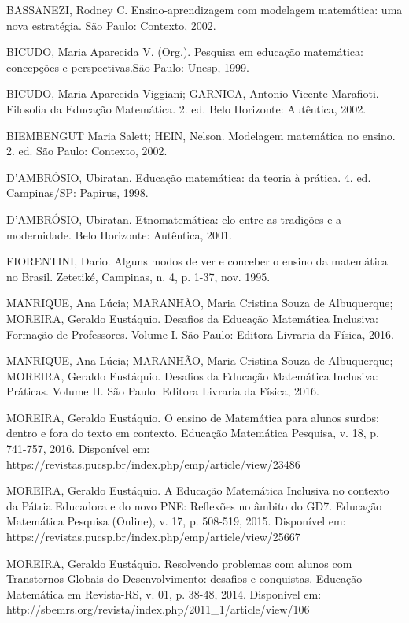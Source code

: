 \begin{thebibliography}{999}
	 BASSANEZI, Rodney C. Ensino-aprendizagem com modelagem matemática: uma nova estratégia. São Paulo: Contexto, 2002. 
	
	 BICUDO, Maria Aparecida V. (Org.). Pesquisa em educação matemática: concepções e perspectivas.São Paulo: Unesp, 1999.
	
	 BICUDO, Maria Aparecida Viggiani; GARNICA, Antonio Vicente Marafioti. Filosofia da Educação Matemática. 2. ed. Belo Horizonte: Autêntica, 2002.
	
	 BIEMBENGUT Maria Salett; HEIN, Nelson. Modelagem matemática no ensino. 2. ed. São Paulo: Contexto, 2002.
	
	 D’AMBRÓSIO, Ubiratan. Educação matemática: da teoria à prática. 4. ed. Campinas/SP: Papirus, 1998.
	
	 D’AMBRÓSIO, Ubiratan. Etnomatemática: elo entre as tradições e a modernidade. Belo Horizonte: Autêntica, 2001.
	
	 FIORENTINI, Dario. Alguns modos de ver e conceber o ensino da matemática no Brasil. Zetetiké, Campinas, n. 4, p. 1-37, nov. 1995.
	
	 MANRIQUE, Ana Lúcia; MARANHÃO, Maria Cristina Souza de Albuquerque; MOREIRA, Geraldo Eustáquio. Desafios da Educação Matemática Inclusiva: Formação de Professores. Volume I. São Paulo: Editora Livraria da Física, 2016.
	
	 MANRIQUE, Ana Lúcia; MARANHÃO, Maria Cristina Souza de Albuquerque; MOREIRA, Geraldo Eustáquio. Desafios da Educação Matemática Inclusiva: Práticas. Volume II. São Paulo: Editora Livraria da Física, 2016.
	
	 MOREIRA, Geraldo Eustáquio. O ensino de Matemática para alunos surdos: dentro e fora do texto em contexto. Educação Matemática Pesquisa, v. 18, p. 741-757, 2016. Disponível em: https://revistas.pucsp.br/index.php/emp/article/view/23486
	
	 MOREIRA, Geraldo Eustáquio. A Educação Matemática Inclusiva no contexto da Pátria Educadora e do novo PNE: Reflexões no âmbito do GD7. Educação Matemática Pesquisa (Online), v. 17, p. 508-519, 2015. Disponível em: https://revistas.pucsp.br/index.php/emp/article/view/25667
	
	 MOREIRA, Geraldo Eustáquio. Resolvendo problemas com alunos com Transtornos Globais do Desenvolvimento: desafios e conquistas. Educação Matemática em Revista-RS, v. 01, p. 38-48, 2014. Disponível em: http://sbemrs.org/revista/index.php/2011\_1/article/view/106
	

\end{thebibliography}
